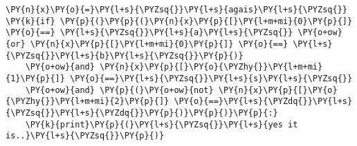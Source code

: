 \begin{Verbatim}[commandchars=\\\{\}]
\PY{n}{x}\PY{o}{=}\PY{l+s}{\PYZsq{}}\PY{l+s}{agais}\PY{l+s}{\PYZsq{}}
\PY{k}{if} \PY{p}{(}\PY{p}{(}\PY{n}{x}\PY{p}{[}\PY{l+m+mi}{0}\PY{p}{]} \PY{o}{==} \PY{l+s}{\PYZsq{}}\PY{l+s}{a}\PY{l+s}{\PYZsq{}} \PY{o+ow}{or} \PY{n}{x}\PY{p}{[}\PY{l+m+mi}{0}\PY{p}{]} \PY{o}{==} \PY{l+s}{\PYZsq{}}\PY{l+s}{b}\PY{l+s}{\PYZsq{}}\PY{p}{)}
    \PY{o+ow}{and} \PY{n}{x}\PY{p}{[}\PY{o}{\PYZhy{}}\PY{l+m+mi}{1}\PY{p}{]} \PY{o}{==}\PY{l+s}{\PYZsq{}}\PY{l+s}{s}\PY{l+s}{\PYZsq{}}
    \PY{o+ow}{and} \PY{p}{(}\PY{o+ow}{not} \PY{n}{x}\PY{p}{[}\PY{o}{\PYZhy{}}\PY{l+m+mi}{2}\PY{p}{]} \PY{o}{==}\PY{l+s}{\PYZdq{}}\PY{l+s}{\PYZsq{}}\PY{l+s}{\PYZdq{}}\PY{p}{)}\PY{p}{)}\PY{p}{:}
    \PY{k}{print}\PY{p}{(}\PY{l+s}{\PYZsq{}}\PY{l+s}{yes it is..}\PY{l+s}{\PYZsq{}}\PY{p}{)}
\end{Verbatim}
